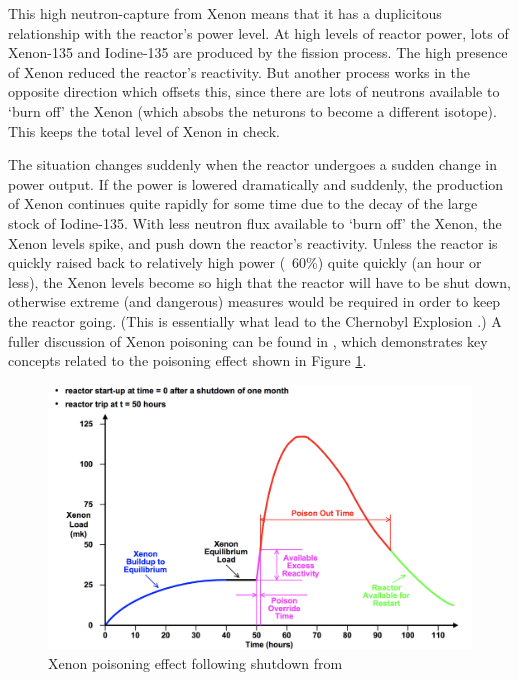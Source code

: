 \documentclass{article}\usepackage[]{graphicx}\usepackage[]{color}
\begin{document}
This high neutron-capture from Xenon means that it has a duplicitous relationship with the reactor's power level.  At high levels of reactor power, lots of Xenon-135 and Iodine-135 are produced by the fission process.  The high presence of Xenon reduced the reactor's reactivity.  But another process works in the opposite direction which offsets this, since there are lots of neutrons available to `burn off' the Xenon (which absobs the neturons to become a different isotope).  This keeps the total level of Xenon in check.

The situation changes suddenly when the reactor undergoes a sudden change in power output.  If the power is lowered dramatically and suddenly, the production of Xenon continues quite rapidly for some time due to the decay of the large stock of Iodine-135.  With less neutron flux available to `burn off' the Xenon, the Xenon levels spike, and push down the reactor's reactivity.  Unless the reactor is quickly raised back to relatively high power (~60\%) quite quickly (an hour or less), the Xenon levels become so high that the reactor will have to be shut down, otherwise extreme (and dangerous) measures would be required in order to keep the reactor going.  (This is essentially what lead to the Chernobyl Explosion \parencite{WNA2009}.)  A fuller discussion of Xenon poisoning can be found in \cite{garland2005}, which demonstrates key concepts related to the poisoning effect shown in Figure \ref{fig:XenonPoison.png}.

\begin{figure}[h]
\includegraphics[width=\textwidth]{XenonPoison.png}
\caption{Xenon poisoning effect following shutdown from \parencite{garland2005}}
\label{fig:XenonPoison.png}
\end{figure}
\end{document}
